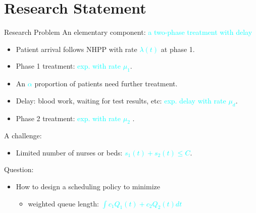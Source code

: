 \documentclass[smaller ,table,usenames,dvipsnames]{beamer}
\newcommand{\?}{\stackrel{?}{=}}
\begin{document}
\section{Research Statement}
\begin{frame}{Research Problem}
An elementary component: \textcolor{Cyan}{a two-phase treatment with delay}
\smallskip
\begin{itemize}
    \item Patient arrival follows NHPP with rate \textcolor{Cyan}{$\lambda(t)$} at phase 1.\medskip
	\item Phase 1 treatment: \textcolor{Cyan}{exp. with rate $\mu_1$}. \medskip 
	\item An \textcolor{Cyan}{$\alpha$} proportion of patients need further treatment. \medskip
	\item Delay: blood work, waiting for test results, etc: \textcolor{Cyan}{exp. delay with rate $\mu_d$}.\medskip
	\item Phase 2 treatment: \textcolor{Cyan}{exp. with rate $\mu_2$} .\medskip
\end{itemize}
A challenge:\smallskip
\begin{itemize}
	\item {Limited number of nurses or beds}: \textcolor{Cyan}{$s_1(t) + s_2(t) \leq C$}.\medskip
\end{itemize}

Question:
\begin{itemize}
	\item How to design a scheduling policy to minimize 
	\begin{itemize}
	    \item weighted queue length: \textcolor{Cyan}{$\int c_1Q_1(t)+c_2Q_2(t)dt$}
	\end{itemize}
\end{itemize}
\end{frame}
\end{document}

